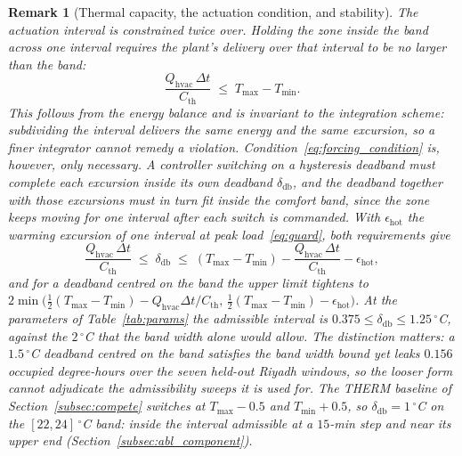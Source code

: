 \documentclass[pdflatex,sn-mathphys-num,iicol]{sn-jnl}
\theoremstyle{thmstyleone}\newtheorem{proposition}{Proposition}\newtheorem{corollary}{Corollary}
\theoremstyle{thmstyletwo}\newtheorem{remark}{Remark}\newtheorem{observation}{Observation}
\theoremstyle{thmstylethree}\newtheorem{definition}{Definition}
\newcommand{\Tmin}{T_{\min}}
\newcommand{\Tmax}{T_{\max}}
\newcommand{\deadband}{\delta_{\mathrm{db}}}
\newcommand{\Cth}{C_{\mathrm{th}}}
\newcommand{\Qhvac}{Q_{\mathrm{hvac}}}
\begin{document}
\begin{remark}[Thermal capacity, the actuation condition, and stability]
The actuation interval is constrained twice over. Holding the zone inside the band across one interval requires the plant's delivery over that interval to be no larger than the band:
\begin{equation}
  \frac{\Qhvac\,\Delta t}{\Cth}\;\le\;\Tmax-\Tmin .
  \label{eq:forcing_condition}
\end{equation}
This follows from the energy balance and is \emph{invariant to the integration scheme}: subdividing the interval delivers the same energy and the same excursion, so a finer integrator cannot remedy a violation. Condition~\eqref{eq:forcing_condition} is, however, only necessary. A controller switching on a hysteresis deadband must complete each excursion inside \emph{its own} deadband $\deadband$, and the deadband together with those excursions must in turn fit inside the comfort band, since the zone keeps moving for one interval after each switch is commanded. With $\epsilon_{\mathrm{hot}}$ the warming excursion of one interval at peak load~\eqref{eq:guard}, both requirements give
\begin{equation}
  \frac{\Qhvac\,\Delta t}{\Cth}\;\le\;\deadband\;\le\;
  (\Tmax-\Tmin)-\frac{\Qhvac\,\Delta t}{\Cth}-\epsilon_{\mathrm{hot}},
  \label{eq:deadband_condition}
\end{equation}
and for a deadband centred on the band the upper limit tightens to $2\min\!\bigl(\tfrac{1}{2}(\Tmax-\Tmin)-\Qhvac\Delta t/\Cth,\, \tfrac{1}{2}(\Tmax-\Tmin)-\epsilon_{\mathrm{hot}}\bigr)$. At the parameters of Table~\ref{tab:params} the admissible interval is $0.375\le\deadband\le1.25\,^\circ$C, against the $2\,^\circ$C that the band width alone would allow. The distinction matters: a $1.5\,^\circ$C deadband centred on the band satisfies the band width bound yet leaks $0.156$ occupied degree-hours over the seven held-out Riyadh windows, so the looser form cannot adjudicate the admissibility sweeps it is used for. The THERM baseline of Section~\ref{subsec:compete} switches at $\Tmax-0.5$ and $\Tmin+0.5$, so $\deadband=1\,^\circ$C on the $[22,24]\,^\circ$C band: inside the interval admissible at a $15$-min step and near its upper end (Section~\ref{subsec:abl_component}).


\end{remark}
\end{document}
